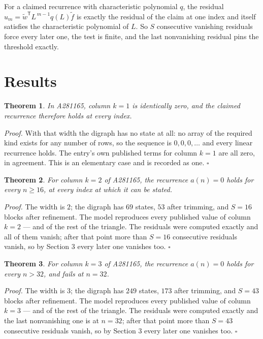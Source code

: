 \documentclass[11pt]{article}
\newtheorem{theorem}{Theorem}
\theoremstyle{definition}
\begin{document}
For a claimed recurrence with characteristic polynomial $q$, the residual $u_m = \tilde w^{\mathsf T}L^{\,m-1}q(L)\tilde f$ is exactly the residual of the claim at one index and itself satisfies the characteristic polynomial of $L$. So $S$ consecutive vanishing residuals force every later one, the test is finite, and the last nonvanishing residual pins the threshold exactly.

\section{Results}

\begin{theorem} In A281165, column $k = 1$ is identically zero, and the claimed recurrence therefore holds at every index.\end{theorem}

{\itshape Proof.} With that width the digraph has no state at all: no array of the required kind exists for any number of rows, so the sequence is $0,0,0,\dots$ and every linear recurrence holds. The entry's own published terms for column $k = 1$ are all zero, in agreement. This is an elementary case and is recorded as one. $\square$

\begin{theorem} For column $k = 2$ of A281165, the recurrence $a(n) = 0$ holds for every $n \ge 16$, at every index at which it can be stated.\end{theorem}

{\itshape Proof.} The width is $2$; the digraph has $69$ states, $53$ after trimming, and $S = 16$ blocks after refinement. The model reproduces every published value of column $k = 2$ --- and of the rest of the triangle. The residuals were computed exactly and all of them vanish; after that point more than $S = 16$ consecutive residuals vanish, so by Section 3 every later one vanishes too. $\square$

\begin{theorem} For column $k = 3$ of A281165, the recurrence $a(n) = 0$ holds for every $n > 32$, and fails at $n = 32$.\end{theorem}

{\itshape Proof.} The width is $3$; the digraph has $249$ states, $173$ after trimming, and $S = 43$ blocks after refinement. The model reproduces every published value of column $k = 3$ --- and of the rest of the triangle. The residuals were computed exactly and the last nonvanishing one is at $n = 32$; after that point more than $S = 43$ consecutive residuals vanish, so by Section 3 every later one vanishes too. $\square$
\end{document}
